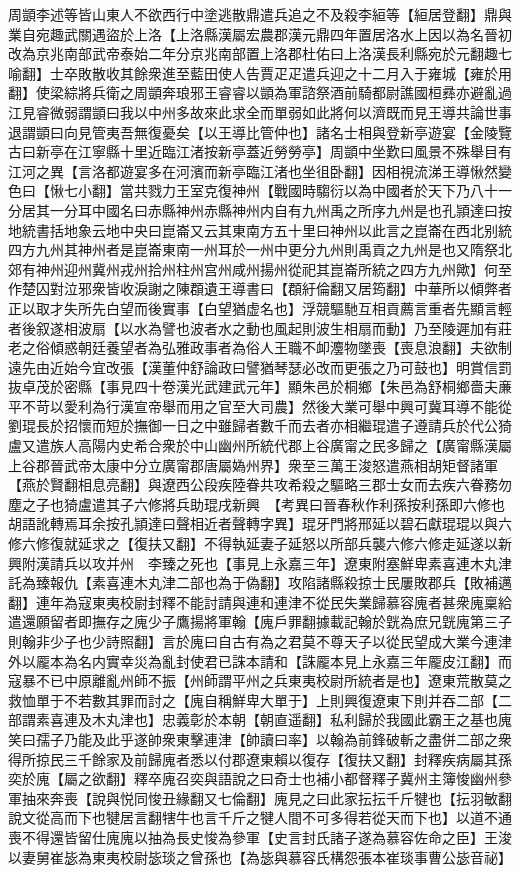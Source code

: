 周顗李述等皆山東人不欲西行中塗逃散鼎遣兵追之不及殺李絙等【絙居登翻】鼎與業自宛趣武關遇盜於上洛【上洛縣漢屬宏農郡漢元鼎四年置居洛水上因以為名晉初改為京兆南部武帝泰始二年分京兆南部置上洛郡杜佑曰上洛漢長利縣宛於元翻趣七喻翻】士卒敗散收其餘衆進至藍田使人告賈疋疋遣兵迎之十二月入于雍城【雍於用翻】使梁綜將兵衛之周顗奔琅邪王睿睿以顗為軍諮祭酒前騎都尉譙國桓彞亦避亂過江見睿微弱謂顗曰我以中州多故來此求全而單弱如此將何以濟既而見王導共論世事退謂顗曰向見管夷吾無復憂矣【以王導比管仲也】諸名士相與登新亭遊宴【金陵覽古曰新亭在江寧縣十里近臨江渚按新亭蓋近勞勞亭】周顗中坐歎曰風景不殊舉目有江河之異【言洛都遊宴多在河濱而新亭臨江渚也坐徂卧翻】因相視流涕王導愀然變色曰【愀七小翻】當共戮力王室克復神州【戰國時騶衍以為中國者於天下乃八十一分居其一分耳中國名曰赤縣神州赤縣神州内自有九州禹之所序九州是也孔頴達曰按地統書括地象云地中央曰崑崙又云其東南方五十里曰神州以此言之崑崙在西北别統四方九州其神州者是崑崙東南一州耳於一州中更分九州則禹貢之九州是也又隋祭北郊有神州迎州冀州戎州拾州柱州宫州咸州揚州從祀其崑崙所統之四方九州歟】何至作楚囚對泣邪衆皆收淚謝之陳頵遺王導書曰【頵紆倫翻又居筠翻】中華所以傾弊者正以取才失所先白望而後實事【白望猶虚名也】浮競驅馳互相貢薦言重者先顯言輕者後叙遂相波扇【以水為譬也波者水之動也風起則波生相扇而動】乃至陵遲加有莊老之俗傾惑朝廷養望者為弘雅政事者為俗人王職不卹灋物墜喪【喪息浪翻】夫欲制遠先由近始今宜改張【漢董仲舒論政曰譬猶琴瑟必改而更張之乃可鼓也】明賞信罰抜卓茂於密縣【事見四十卷漢光武建武元年】顯朱邑於桐鄉【朱邑為舒桐鄉嗇夫亷平不苛以愛利為行漢宣帝舉而用之官至大司農】然後大業可舉中興可冀耳導不能從　劉琨長於招懷而短於撫御一日之中雖歸者數千而去者亦相繼琨遣子遵請兵於代公猗盧又遣族人高陽内史希合衆於中山幽州所統代郡上谷廣甯之民多歸之【廣甯縣漢屬上谷郡晉武帝太康中分立廣甯郡唐屬媯州界】衆至三萬王浚怒遣燕相胡矩督諸軍【燕於賢翻相息亮翻】與遼西公段疾陸眷共攻希殺之驅略三郡士女而去疾六眷務勿塵之子也猗盧遣其子六修將兵助琨戌新興　【考異曰晉春秋作利孫按利孫即六修也胡語訛轉焉耳余按孔頴達曰聲相近者聲轉字異】琨牙門將邢延以碧石獻琨琨以與六修六修復就延求之【復扶又翻】不得執延妻子延怒以所部兵襲六修六修走延遂以新興附漢請兵以攻并州　李臻之死也【事見上永嘉三年】遼東附塞鮮卑素喜連木丸津託為臻報仇【素喜連木丸津二部也為于偽翻】攻陷諸縣殺掠士民屢敗郡兵【敗補邁翻】連年為寇東夷校尉封釋不能討請與連和連津不從民失業歸慕容廆者甚衆廆稟給遣還願留者即撫存之廆少子鷹揚將軍翰【廆戶罪翻據載記翰於皝為庶兄皝廆第三子則翰非少子也少詩照翻】言於廆曰自古有為之君莫不尊天子以從民望成大業今連津外以龎本為名内實幸災為亂封使君已誅本請和【誅龎本見上永嘉三年龎皮江翻】而寇暴不已中原離亂州師不振【州師謂平州之兵東夷校尉所統者是也】遼東荒散莫之救恤單于不若數其罪而討之【廆自稱鮮卑大單于】上則興復遼東下則并吞二部【二部謂素喜連及木丸津也】忠義彰於本朝【朝直遥翻】私利歸於我國此霸王之基也廆笑曰孺子乃能及此乎遂帥衆東擊連津【帥讀曰率】以翰為前鋒破斬之盡併二部之衆得所掠民三千餘家及前歸廆者悉以付郡遼東賴以復存【復扶又翻】封釋疾病屬其孫奕於廆【屬之欲翻】釋卒廆召奕與語說之曰奇士也補小都督釋子冀州主簿悛幽州參軍抽來奔喪【說與悦同悛丑緣翻又七倫翻】廆見之曰此家抎抎千斤犍也【抎羽敏翻說文從高而下也犍居言翻犗牛也言千斤之犍人間不可多得若從天而下也】以道不通喪不得還皆留仕廆廆以抽為長史悛為參軍【史言封氏諸子遂為慕容佐命之臣】王浚以妻舅崔毖為東夷校尉毖琰之曾孫也【為毖與慕容氏構怨張本崔琰事曹公毖音祕】

